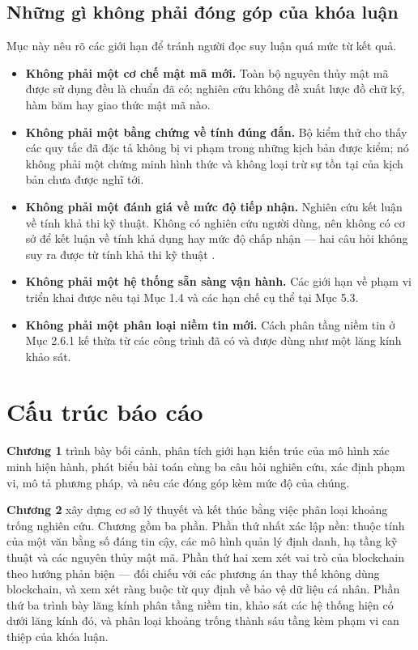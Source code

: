 \subsection{Những gì không phải đóng góp của khóa luận}

Mục này nêu rõ các giới hạn để tránh người đọc suy luận quá mức từ kết quả.

\begin{itemize}
    \item \textbf{Không phải một cơ chế mật mã mới.} Toàn bộ nguyên thủy mật mã được sử dụng đều là chuẩn đã có; nghiên cứu không đề xuất lược đồ chữ ký, hàm băm hay giao thức mật mã nào.
    \item \textbf{Không phải một bằng chứng về tính đúng đắn.} Bộ kiểm thử cho thấy các quy tắc đã đặc tả không bị vi phạm trong những kịch bản được kiểm; nó không phải một chứng minh hình thức và không loại trừ sự tồn tại của kịch bản chưa được nghĩ tới.
    \item \textbf{Không phải một đánh giá về mức độ tiếp nhận.} Nghiên cứu kết luận về tính khả thi kỹ thuật. Không có nghiên cứu người dùng, nên không có cơ sở để kết luận về tính khả dụng hay mức độ chấp nhận --- hai câu hỏi không suy ra được từ tính khả thi kỹ thuật \cite{SSI_Adoption2025}.
    \item \textbf{Không phải một hệ thống sẵn sàng vận hành.} Các giới hạn về phạm vi triển khai được nêu tại Mục 1.4 và các hạn chế cụ thể tại Mục 5.3.
    \item \textbf{Không phải một phân loại niềm tin mới.} Cách phân tầng niềm tin ở Mục 2.6.1 kế thừa từ các công trình đã có và được dùng như một lăng kính khảo sát.
\end{itemize}

\section{Cấu trúc báo cáo}

\noindent \textbf{Chương 1} trình bày bối cảnh, phân tích giới hạn kiến trúc của mô hình xác minh hiện hành, phát biểu bài toán cùng ba câu hỏi nghiên cứu, xác định phạm vi, mô tả phương pháp, và nêu các đóng góp kèm mức độ của chúng.

\noindent \textbf{Chương 2} xây dựng cơ sở lý thuyết và kết thúc bằng việc phân loại khoảng trống nghiên cứu. Chương gồm ba phần. Phần thứ nhất xác lập nền: thuộc tính của một văn bằng số đáng tin cậy, các mô hình quản lý định danh, hạ tầng kỹ thuật và các nguyên thủy mật mã. Phần thứ hai xem xét vai trò của blockchain theo hướng phản biện --- đối chiếu với các phương án thay thế không dùng blockchain, và xem xét ràng buộc từ quy định về bảo vệ dữ liệu cá nhân. Phần thứ ba trình bày lăng kính phân tầng niềm tin, khảo sát các hệ thống hiện có dưới lăng kính đó, và phân loại khoảng trống thành sáu tầng kèm phạm vi can thiệp của khóa luận.

